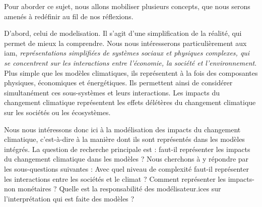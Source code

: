
Pour aborder ce sujet, nous allons mobiliser plusieurs concepts, que nous serons amenés à redéfinir au fil de nos réflexions. 


D'abord, celui de \gls{modelisation}. Il s'agit d'une simplification de la réalité, qui permet de mieux la comprendre. Nous nous intéresserons particulièrement aux \gls{iam}, \textit{représentations simplifiées de systèmes sociaux et physiques complexes, qui se concentrent sur les interactions entre l'économie, la société et l'environnement}. Plus simple que les modèles climatiques, ils représentent à la fois des composantes physiques, économiques et énergétiques. Ils permettent ainsi de considérer simultanément ces sous-systèmes et leurs interactions. Les impacts du changement climatique représentent les effets délétères du changement climatique sur les sociétés ou les écosystèmes. 





Nous nous intéressons donc ici à la modélisation des impacts du changement climatique, c'est-à-dire à la manière dont ils sont représentés dans les modèles intégrés. La question de recherche principale est : faut-il représenter les impacts du changement climatique dans les modèles ? Nous cherchons à y répondre par les sous-questions suivantes : Avec quel niveau de complexité faut-il représenter les interactions entre les sociétés et le climat ? Comment représenter les impacts-non monétaires ? Quelle est la responsabilité des modélisateur.ices sur l'interprétation qui est faite des modèles ?  \\



